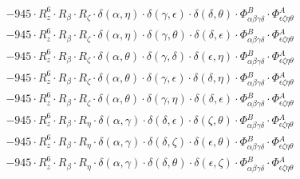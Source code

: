 \documentclass{article}
\begin{document}
\begin{equation}
\begin{array}{c}
 \\[0.2em] 		 - 945 \cdot R_{z}^{6} \cdot R_{\beta{}} \cdot R_{\zeta{}} \cdot \delta{}\left(\alpha{}, \eta{}\right) \cdot \delta{}\left(\gamma{}, \epsilon{}\right) \cdot \delta{}\left(\delta{}, \theta{}\right) \cdot \Phi{}^{B}_{\alpha{}\beta{}\gamma{}\delta{}} \cdot \Phi{}^{A}_{\epsilon{}\zeta{}\eta{}\theta{}} 
 \\[0.2em] 		 - 945 \cdot R_{z}^{6} \cdot R_{\beta{}} \cdot R_{\zeta{}} \cdot \delta{}\left(\alpha{}, \eta{}\right) \cdot \delta{}\left(\gamma{}, \theta{}\right) \cdot \delta{}\left(\delta{}, \epsilon{}\right) \cdot \Phi{}^{B}_{\alpha{}\beta{}\gamma{}\delta{}} \cdot \Phi{}^{A}_{\epsilon{}\zeta{}\eta{}\theta{}} 
 \\[0.2em] 		 - 945 \cdot R_{z}^{6} \cdot R_{\beta{}} \cdot R_{\zeta{}} \cdot \delta{}\left(\alpha{}, \theta{}\right) \cdot \delta{}\left(\gamma{}, \delta{}\right) \cdot \delta{}\left(\epsilon{}, \eta{}\right) \cdot \Phi{}^{B}_{\alpha{}\beta{}\gamma{}\delta{}} \cdot \Phi{}^{A}_{\epsilon{}\zeta{}\eta{}\theta{}} 
 \\[0.2em] 		 - 945 \cdot R_{z}^{6} \cdot R_{\beta{}} \cdot R_{\zeta{}} \cdot \delta{}\left(\alpha{}, \theta{}\right) \cdot \delta{}\left(\gamma{}, \epsilon{}\right) \cdot \delta{}\left(\delta{}, \eta{}\right) \cdot \Phi{}^{B}_{\alpha{}\beta{}\gamma{}\delta{}} \cdot \Phi{}^{A}_{\epsilon{}\zeta{}\eta{}\theta{}} 
 \\[0.2em] 		 - 945 \cdot R_{z}^{6} \cdot R_{\beta{}} \cdot R_{\zeta{}} \cdot \delta{}\left(\alpha{}, \theta{}\right) \cdot \delta{}\left(\gamma{}, \eta{}\right) \cdot \delta{}\left(\delta{}, \epsilon{}\right) \cdot \Phi{}^{B}_{\alpha{}\beta{}\gamma{}\delta{}} \cdot \Phi{}^{A}_{\epsilon{}\zeta{}\eta{}\theta{}} 
 \\[0.2em] 		 - 945 \cdot R_{z}^{6} \cdot R_{\beta{}} \cdot R_{\eta{}} \cdot \delta{}\left(\alpha{}, \gamma{}\right) \cdot \delta{}\left(\delta{}, \epsilon{}\right) \cdot \delta{}\left(\zeta{}, \theta{}\right) \cdot \Phi{}^{B}_{\alpha{}\beta{}\gamma{}\delta{}} \cdot \Phi{}^{A}_{\epsilon{}\zeta{}\eta{}\theta{}} 
 \\[0.2em] 		 - 945 \cdot R_{z}^{6} \cdot R_{\beta{}} \cdot R_{\eta{}} \cdot \delta{}\left(\alpha{}, \gamma{}\right) \cdot \delta{}\left(\delta{}, \zeta{}\right) \cdot \delta{}\left(\epsilon{}, \theta{}\right) \cdot \Phi{}^{B}_{\alpha{}\beta{}\gamma{}\delta{}} \cdot \Phi{}^{A}_{\epsilon{}\zeta{}\eta{}\theta{}} 
 \\[0.2em] 		 - 945 \cdot R_{z}^{6} \cdot R_{\beta{}} \cdot R_{\eta{}} \cdot \delta{}\left(\alpha{}, \gamma{}\right) \cdot \delta{}\left(\delta{}, \theta{}\right) \cdot \delta{}\left(\epsilon{}, \zeta{}\right) \cdot \Phi{}^{B}_{\alpha{}\beta{}\gamma{}\delta{}} \cdot \Phi{}^{A}_{\epsilon{}\zeta{}\eta{}\theta{}} 

\end{array}
\end{equation}
\end{document}
